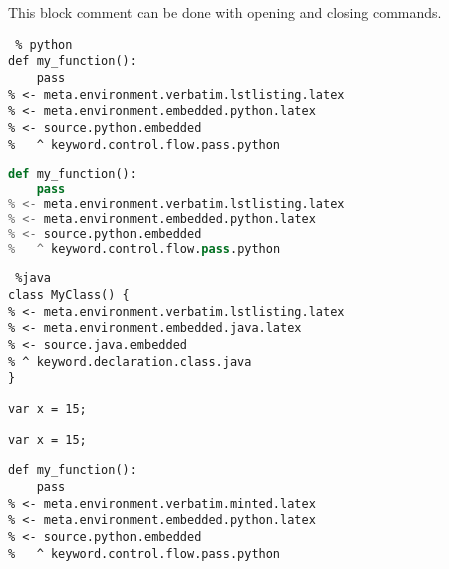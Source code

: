 \documentclass[12pt]{article}
\newcommand\"{quote}
\begin{document}
\comment
This block comment can be done with
opening and closing commands.
\endcomment



\begin{lstlisting} % python
def my_function():
    pass
% <- meta.environment.verbatim.lstlisting.latex
% <- meta.environment.embedded.python.latex
% <- source.python.embedded
%   ^ keyword.control.flow.pass.python
\end{lstlisting}

\begin{lstlisting}[frame=single,
                   language=python] %python
def my_function():
    pass
% <- meta.environment.verbatim.lstlisting.latex
% <- meta.environment.embedded.python.latex
% <- source.python.embedded
%   ^ keyword.control.flow.pass.python
\end{lstlisting}

\begin{lstlisting} %java
class MyClass() {
% <- meta.environment.verbatim.lstlisting.latex
% <- meta.environment.embedded.java.latex
% <- source.java.embedded
% ^ keyword.declaration.class.java
}
\end{lstlisting}

\lstinline{var x = 15;}

\lstinline|var x = 15;|



\begin{verbatim}
def my_function():
    pass
% <- meta.environment.verbatim.minted.latex
% <- meta.environment.embedded.python.latex
% <- source.python.embedded
%   ^ keyword.control.flow.pass.python
\end{verbatim}
\end{document}
